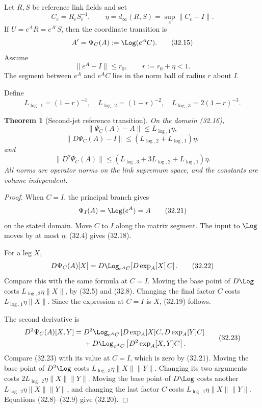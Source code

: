 \documentclass[11pt]{article}
\newtheorem{theorem}{Theorem}[section]
\begin{document}
Let \(R,S\) be reference link fields and set
\[
 C_e=R_eS_e^{-1},\qquad
 \eta=d_\infty(R,S)=\sup_e\|C_e-I\|.
 \tag{32.14}
\]
If \(U=e^AR=e^{A'}S\), then the coordinate transition is
\[
 A'=\Psi_C(A):=\Log(e^AC).
 \tag{32.15}
\]
Assume
\[
 \|e^A-I\|\leq r_0,\qquad
 r:=r_0+\eta<1.
 \tag{32.16}
\]
The segment between \(e^A\) and \(e^AC\) lies in the norm ball of radius
\(r\) about \(I\).

Define
\[
 L_{\log,1}=(1-r)^{-1},\quad
 L_{\log,2}=(1-r)^{-2},\quad
 L_{\log,3}=2(1-r)^{-3}.
 \tag{32.17}
\]

\begin{theorem}[Second-jet reference transition]
\label{thm:v11v32-transition}
On the domain (32.16),
\[
 \|\Psi_C(A)-A\|
 \leq L_{\log,1}\eta,
 \tag{32.18}
\]
\[
 \|D\Psi_C(A)-I\|
 \leq
 \left(L_{\log,2}+L_{\log,1}\right)\eta,
 \tag{32.19}
\]
and
\[
 \|D^2\Psi_C(A)\|
 \leq
 \left(
 L_{\log,3}+3L_{\log,2}+L_{\log,1}
 \right)\eta.
 \tag{32.20}
\]
All norms are operator norms on the link supremum space, and the
constants are volume independent.
\end{theorem}

\begin{proof}
When \(C=I\), the principal branch gives
\[
 \Psi_I(A)=\Log(e^A)=A
 \tag{32.21}
\]
on the stated domain.  Move \(C\) to \(I\) along the matrix segment.
The input to \(\Log\) moves by at most \(\eta\); (32.4) gives (32.18).

For a leg \(X\),
\[
 D\Psi_C(A)[X]
 =
 D\Log_{e^AC}\!\left[D\exp_A[X]\,C\right].
 \tag{32.22}
\]
Compare this with the same formula at \(C=I\).  Moving the base point of
\(D\Log\) costs \(L_{\log,2}\eta\|X\|\), by (32.5) and (32.8).
Changing the final factor \(C\) costs
\(L_{\log,1}\eta\|X\|\).  Since the expression at \(C=I\) is \(X\),
(32.19) follows.

The second derivative is
\[
 \begin{split}
 D^2\Psi_C(A)[X,Y]
 ={}&
 D^2\Log_{e^AC}
 \left[D\exp_A[X]C,D\exp_A[Y]C\right]\\
 &+
 D\Log_{e^AC}\left[D^2\exp_A[X,Y]C\right].
 \end{split}
 \tag{32.23}
\]
Compare (32.23) with its value at \(C=I\), which is zero by (32.21).
Moving the base point of \(D^2\Log\) costs
\(L_{\log,3}\eta\|X\|\|Y\|\).  Changing its two arguments costs
\(2L_{\log,2}\eta\|X\|\|Y\|\).  Moving the base point of
\(D\Log\) costs another
\(L_{\log,2}\eta\|X\|\|Y\|\), and changing the last factor \(C\)
costs \(L_{\log,1}\eta\|X\|\|Y\|\).
Equations (32.8)--(32.9) give (32.20).
\end{proof}
\end{document}

